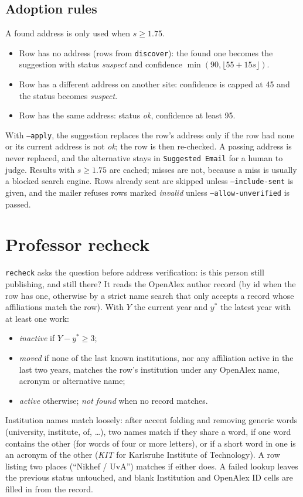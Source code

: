 \documentclass[11pt,a4paper]{article}
\newcommand{\code}[1]{\texttt{#1}}
\begin{document}
\subsection{Adoption rules}
A found address is only used when $s \ge 1.75$.
\begin{itemize}
  \item Row has no address (rows from \code{discover}): the found one becomes the suggestion with
        status \emph{suspect} and confidence $\min(90, \lfloor 55 + 15 s \rfloor)$.
  \item Row has a different address on another site: confidence is capped at 45 and the status
        becomes \emph{suspect}.
  \item Row has the same address: status \emph{ok}, confidence at least 95.
\end{itemize}
With \code{--apply}, the suggestion replaces the row's address only if the row had none or its
current address is not \emph{ok}; the row is then re-checked. A passing address is never
replaced, and the alternative stays in \code{Suggested Email} for a human to judge. Results with
$s \ge 1.75$ are cached; misses are not, because a miss is usually a blocked search engine. Rows
already sent are skipped unless \code{--include-sent} is given, and the mailer refuses rows marked
\emph{invalid} unless \code{--allow-unverified} is passed.

\section{Professor recheck}

\code{recheck} asks the question before address verification: is this person still publishing,
and still there? It reads the OpenAlex author record (by id when the row has one, otherwise by
a strict name search that only accepts a record whose affiliations match the row). With $Y$ the
current year and $y^\ast$ the latest year with at least one work:
\begin{itemize}
  \item \emph{inactive} if $Y - y^\ast \ge 3$;
  \item \emph{moved} if none of the last known institutions, nor any affiliation active in the
        last two years, matches the row's institution under any OpenAlex name, acronym or
        alternative name;
  \item \emph{active} otherwise; \emph{not found} when no record matches.
\end{itemize}
Institution names match loosely: after accent folding and removing generic words (university,
institute, of, \ldots), two names match if they share a word, if one word contains the other (for
words of four or more letters), or if a short word in one is an acronym of the other
(\emph{KIT} for Karlsruhe Institute of Technology). A row listing two places (``Nikhef / UvA'')
matches if either does. A failed lookup leaves the previous status untouched, and blank
Institution and OpenAlex ID cells are filled in from the record.
\end{document}
